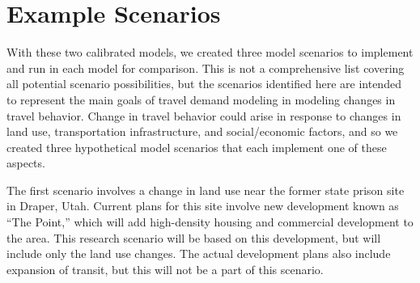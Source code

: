 \documentclass[fancy, twoside, mastersfancy, ms]{byuthesis}
\begin{document}
\begin{table}

\caption{\label{tbl-asim-dap-model-rw-coeffs}Daily Activity Pattern
Submodel Coefficients in ActivitySim}


\end{table}%

\section{Example Scenarios}\label{example-scenarios}

With these two calibrated models, we created three model scenarios to
implement and run in each model for comparison. This is not a
comprehensive list covering all potential scenario possibilities, but
the scenarios identified here are intended to represent the main goals
of travel demand modeling in modeling changes in travel behavior. Change
in travel behavior could arise in response to changes in land use,
transportation infrastructure, and social/economic factors, and so we
created three hypothetical model scenarios that each implement one of
these aspects.

The first scenario involves a change in land use near the former state
prison site in Draper, Utah. Current plans for this site involve new
development known as ``The Point,'' which will add high-density housing
and commercial development to the area. This research scenario will be
based on this development, but will include only the land use changes.
The actual development plans also include expansion of transit, but this
will not be a part of this scenario.
\end{document}
